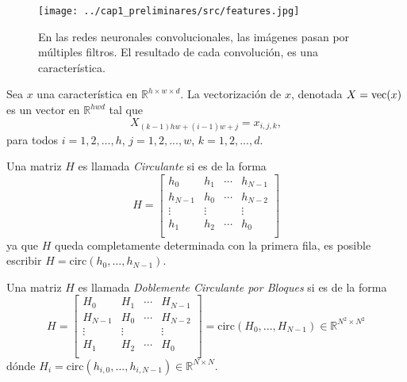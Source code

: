     \begin{figure}[H]
        \centering
        \texttt{[image: ../cap1\_preliminares/src/features.jpg]}
        \caption{En las redes neuronales convolucionales, las imágenes pasan por múltiples filtros. El resultado de cada convolución, es una característica.} 
    \end{figure}

    \begin{definition}
        Sea $x$ una característica en $\mathbb R^{h\times w\times d}$. La vectorización de $x$, denotada $X = \operatorname{vec}(x)$ es un vector en $\mathbb R^{hwd}$ tal que 
        \begin{equation}
            X_{(k-1)hw + (i-1)w + j} = x_{i,j,k},
        \end{equation}
        para todos $i=1,2, ..., h$, $j = 1, 2, ..., w$, $k= 1,2,..., d$.
    \end{definition}
    \begin{definition}
        Una matriz $H$ es llamada \textsl{Circulante} si es de la forma
        \begin{equation}
            H = \begin{bmatrix}
                h_0 & h_1 & \cdots & h_{N-1} \\
                h_{N-1} & h_0 & \cdots & h_{N-2} \\
                \vdots & \vdots &  & \vdots \\
                h_1 & h_2 & \cdots & h_{0} \\
            \end{bmatrix}
        \end{equation}
        ya que $H$ queda completamente determinada con la primera fila, es posible escribir $H = \text{circ}(h_0, ..., h_{N-1})$.
    \end{definition} 
    \begin{definition}
        \label{doubly_circulant_matrix}
        Una matriz $H$ es llamada \textsl{Doblemente Circulante por Bloques} si es de la forma
        \begin{equation}
            H = \begin{bmatrix}
                H_0 & H_1 & \cdots & H_{N-1} \\
                H_{N-1} & H_0 & \cdots & H_{N-2} \\
                \vdots & \vdots &  & \vdots \\
                H_1 & H_2 & \cdots & H_{0} \\
            \end{bmatrix} = \text{circ}(H_0, ..., H_{N-1}) \in \mathbb R^{N^2\times N^2}
        \end{equation}
        dónde $H_i = \text{circ}(h_{i,0}, ..., h_{i, N-1}) \in \mathbb R^{N \times N}$.
    \end{definition}


